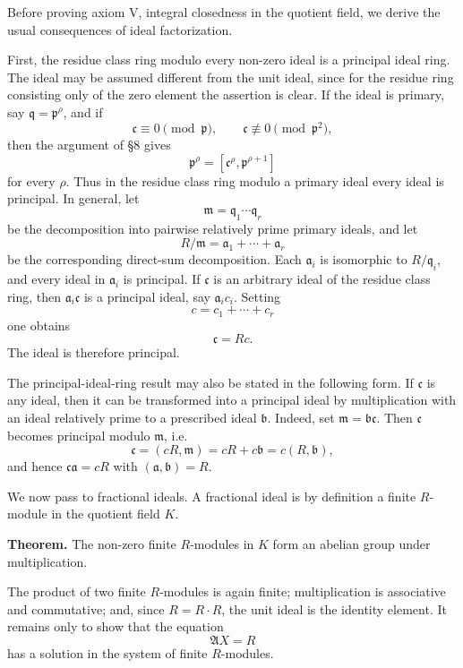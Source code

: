 \documentclass[
  12pt,
]{article}
\begin{document}
Before proving axiom V, integral closedness in the quotient field, we
derive the usual consequences of ideal factorization.

First, the residue class ring modulo every non-zero ideal is a principal
ideal ring. The ideal may be assumed different from the unit ideal,
since for the residue ring consisting only of the zero element the
assertion is clear. If the ideal is primary, say
\(\mathfrak q=\mathfrak p^{\rho}\), and if \[
  \mathfrak c\equiv0\pmod{\mathfrak p},
  \qquad \mathfrak c\not\equiv0\pmod{\mathfrak p^2},
\] then the argument of §8 gives \[
  \mathfrak p^{\rho}=[\mathfrak c^{\rho},\mathfrak p^{\rho+1}]
\] for every \(\rho\). Thus in the residue class ring modulo a primary
ideal every ideal is principal. In general, let \[
  \mathfrak m=\mathfrak q_1\cdots\mathfrak q_r
\] be the decomposition into pairwise relatively prime primary ideals,
and let \[
  R/\mathfrak m=\mathfrak a_1+\cdots+\mathfrak a_r
\] be the corresponding direct-sum decomposition. Each \(\mathfrak a_i\)
is isomorphic to \(R/\mathfrak q_i\), and every ideal in
\(\mathfrak a_i\) is principal. If \(\mathfrak c\) is an arbitrary ideal
of the residue class ring, then \(\mathfrak a_i\mathfrak c\) is a
principal ideal, say \(\mathfrak a_i c_i\). Setting \[
  c=c_1+\cdots+c_r
\] one obtains \[
  \mathfrak c=Rc.
\] The ideal is therefore principal.

The principal-ideal-ring result may also be stated in the following
form. If \(\mathfrak c\) is any ideal, then it can be transformed into a
principal ideal by multiplication with an ideal relatively prime to a
prescribed ideal \(\mathfrak b\). Indeed, set
\(\mathfrak m=\mathfrak b\mathfrak c\). Then \(\mathfrak c\) becomes
principal modulo \(\mathfrak m\), i.e. \[
  \mathfrak c=(cR,\mathfrak m)=cR+c\mathfrak b=c(R,\mathfrak b),
\] and hence \(\mathfrak c\mathfrak a=cR\) with
\((\mathfrak a,\mathfrak b)=R\).

We now pass to fractional ideals. A fractional ideal is by definition a
finite \(R\)-module in the quotient field \(K\).

\textbf{Theorem.} The non-zero finite \(R\)-modules in \(K\) form an
abelian group under multiplication.

The product of two finite \(R\)-modules is again finite; multiplication
is associative and commutative; and, since \(R=R\cdot R\), the unit
ideal is the identity element. It remains only to show that the equation
\[
  \mathfrak A X=R
\] has a solution in the system of finite \(R\)-modules.
\end{document}
